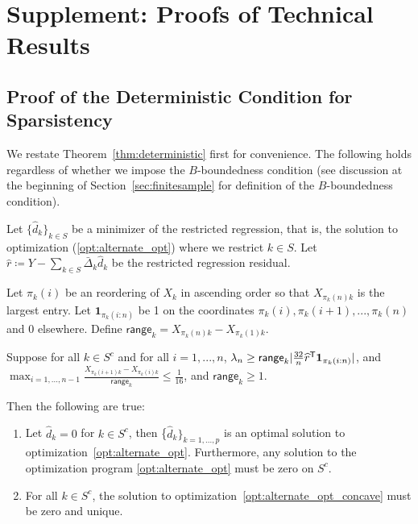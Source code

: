 
\section{Supplement:  Proofs of Technical Results}
 
 
 \subsection{Proof of the Deterministic Condition for Sparsistency}
 \label{sec:deterministic_proof}
 
We restate Theorem~\ref{thm:deterministic} first for convenience. 
The following holds regardless of whether we impose the $B$-boundedness condition (see discussion at the beginning of Section~\ref{sec:finitesample} for definition of the $B$-boundedness condition).
 
\begin{theorem} 
Let $\{\hat{d}_k \}_{k \in S}$ be a minimizer of the restricted regression, that is, the solution to optimization (\ref{opt:alternate_opt}) where we restrict $k \in S$. 
Let $\hat{r} \coloneqq Y - \sum_{k \in S} \bar{\Delta}_k \hat{d}_k$ be the restricted regression residual. 


Let $\pi_k(i)$ be an reordering of $X_k$ in ascending order so that $X_{\pi_k(n)k}$ is the largest entry. Let $\mathbf{1}_{\pi_k(i:n)}$ be 1 on the coordinates $\pi_k(i),\pi_k(i+1),...,\pi_k(n)$ and 0 elsewhere. Define $\mathsf{range}_k = X_{\pi_k(n)k} - X_{\pi_k(1)k}$.

Suppose for all $k\in S^c$ and for all $i=1,...,n$, $\lambda_n \geq \mathsf{range}_k | \frac{32}{n} \widehat{r}^{\mathsf{T}} \mbox{\boldmath $1$}_{\pi_k(i:n)}|$, and $\max_{i=1,...,n-1} \frac{X_{\pi_k(i+1)k} - X_{\pi_k(i)k}}{\mathsf{range}_k} \leq \frac{1}{16}$, and $\mathsf{range}_k \geq 1$.

Then the following are true:
\begin{enumerate}
\item Let $\hat{d}_k = 0$ for $k \in S^c$, then \{$\hat{d}_k\}_{k=1,...,p}$ is an optimal solution to optimization~\ref{opt:alternate_opt}. Furthermore, any solution to the optimization program \ref{opt:alternate_opt} must be zero on $S^c$.
\item For all $k \in S^c$, the solution to optimization~\ref{opt:alternate_opt_concave} must be zero and unique.
\end{enumerate}
\end{theorem}


